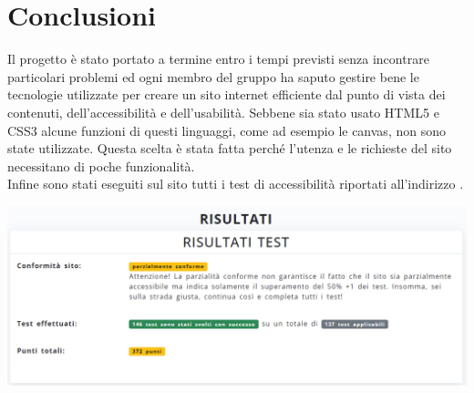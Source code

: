 \section{Conclusioni}
Il progetto è stato portato a termine entro i tempi previsti senza incontrare particolari problemi ed ogni membro del gruppo ha saputo gestire bene le tecnologie utilizzate per creare un sito internet efficiente dal punto di vista dei contenuti, dell'accessibilità e dell'usabilità. Sebbene sia stato usato HTML5 e CSS3 alcune funzioni di questi linguaggi, come ad esempio le canvas, non sono state utilizzate. Questa scelta è stata fatta perché l'utenza e le richieste del sito necessitano di poche funzionalità.\\
Infine sono stati eseguiti sul sito tutti i test di accessibilità riportati all'indirizzo .

\begin{center}
    \includegraphics[scale=0.5]{images/test.png}
\end{center}